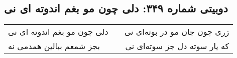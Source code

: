 \begin{center}
\section*{دوبیتی شماره ۳۴۹: دلی چون مو بغم اندوته ای نی}
\label{sec:349}
\begin{longtable}{l p{0.5cm} r}
دلی چون مو بغم اندوته ای نی
&&
زری چون جان مو در بوته‌ای نی
\\
بجز شمعم ببالین همدمی نه
&&
که یار سوته دل جز سوته‌ای نی
\\
\end{longtable}
\end{center}
